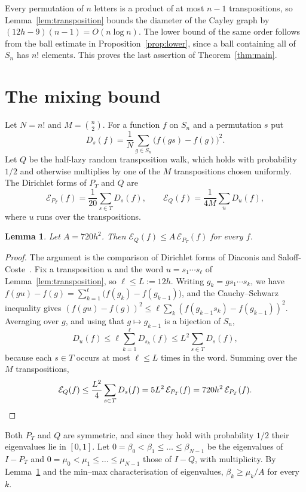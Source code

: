 \documentclass[11pt]{amsart}
\newtheorem{lemma}[theorem]{Lemma}
\theoremstyle{remark}
\numberwithin{equation}{section}
\newcommand{\Dir}{\mathcal{E}}
\begin{document}
Every permutation of $n$ letters is a product of at most $n-1$ transpositions, so Lemma~\ref{lem:transposition} bounds the diameter of the Cayley graph by $(12h-9)(n-1)=O(n\log n)$. The lower bound of the same order follows from the ball estimate in Proposition~\ref{prop:lower}, since a ball containing all of $S_n$ has $n!$ elements. This proves the last assertion of Theorem~\ref{thm:main}.

\section{The mixing bound}\label{sec:mixing}

Let $N=n!$ and $M=\binom n2$. For a function $f$ on $S_n$ and a permutation $s$ put
\[
 D_s(f)=\frac1N\sum_{g\in S_n}\bigl(f(gs)-f(g)\bigr)^2 .
\]
Let $Q$ be the half-lazy random transposition walk, which holds with probability $1/2$ and otherwise multiplies by one of the $M$ transpositions chosen uniformly. The Dirichlet forms of $P_T$ and $Q$ are
\[
 \Dir_{P_T}(f)=\frac1{20}\sum_{s\in T}D_s(f),\qquad \Dir_{Q}(f)=\frac1{4M}\sum_{u}D_u(f),
\]
where $u$ runs over the transpositions.

\begin{lemma}\label{lem:comparison}
Let $A=720h^2$. Then $\Dir_Q(f)\le A\,\Dir_{P_T}(f)$ for every $f$.
\end{lemma}

\begin{proof}
The argument is the comparison of Dirichlet forms of Diaconis and Saloff-Coste~\cite{DSC}. Fix a transposition $u$ and the word $u=s_1\cdots s_\ell$ of Lemma~\ref{lem:transposition}, so $\ell\le L:=12h$. Writing $g_k=gs_1\cdots s_k$, we have $f(gu)-f(g)=\sum_{k=1}^{\ell}\bigl(f(g_k)-f(g_{k-1})\bigr)$, and the Cauchy--Schwarz inequality gives $(f(gu)-f(g))^2\le\ell\sum_k(f(g_{k-1}s_k)-f(g_{k-1}))^2$. Averaging over $g$, and using that $g\mapsto g_{k-1}$ is a bijection of $S_n$,
\[
 D_u(f)\le\ell\sum_{k=1}^{\ell}D_{s_k}(f)\le L^2\sum_{s\in T}D_s(f),
\]
because each $s\in T$ occurs at most $\ell\le L$ times in the word. Summing over the $M$ transpositions,
\[
 \Dir_Q(f)\le\frac{L^2}{4}\sum_{s\in T}D_s(f)=5L^2\,\Dir_{P_T}(f)=720h^2\,\Dir_{P_T}(f).\qedhere
\]
\end{proof}

Both $P_T$ and $Q$ are symmetric, and since they hold with probability $1/2$ their eigenvalues lie in $[0,1]$. Let $0=\beta_0<\beta_1\le\dots\le\beta_{N-1}$ be the eigenvalues of $I-P_T$ and $0=\mu_0<\mu_1\le\dots\le\mu_{N-1}$ those of $I-Q$, with multiplicity. By Lemma~\ref{lem:comparison} and the min--max characterisation of eigenvalues, $\beta_k\ge\mu_k/A$ for every $k$.
\end{document}

